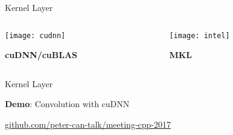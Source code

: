 
\begin{slide}{Kernel Layer}
  \begin{columns}
    \begin{column}{0.5\textwidth}
      \pause
      \centering
      \texttt{[image: cudnn]}

      \vspace{0.4cm}
      \textbf{cuDNN/cuBLAS}
    \end{column}
    \begin{column}{0.5\textwidth}
      \pause
      \centering
      \texttt{[image: intel]}

      \vspace{0.3cm}
      \textbf{MKL}
    \end{column}
  \end{columns}
\end{slide}

\begin{slide}{Kernel Layer}
  \huge

  \vspace{1cm}
  \textbf{Demo}: Convolution with cuDNN

  \vspace{0.5cm}
  {\small\url{github.com/peter-can-talk/meeting-cpp-2017}}
\end{slide}
